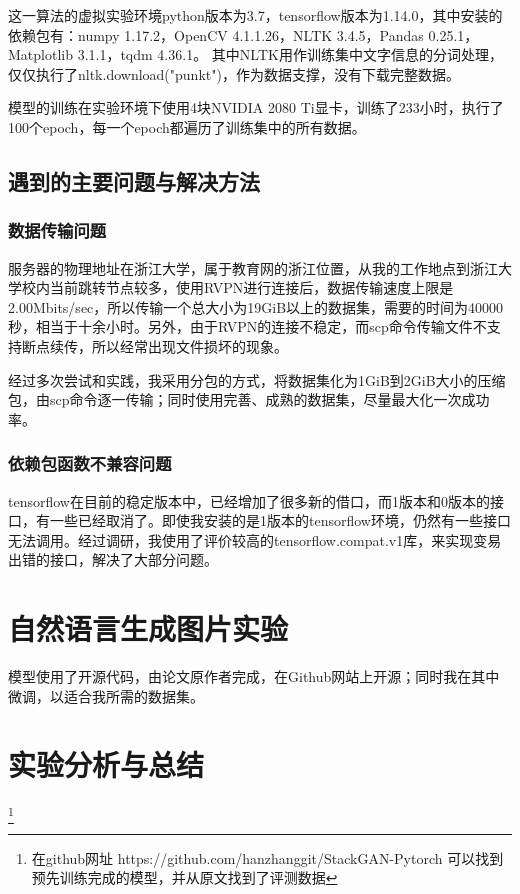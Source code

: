 这一算法的虚拟实验环境python版本为3.7，tensorflow版本为1.14.0，其中安装的依赖包有：numpy 1.17.2，OpenCV 4.1.1.26，NLTK 3.4.5，Pandas 0.25.1，Matplotlib 3.1.1，tqdm 4.36.1。
其中NLTK用作训练集中文字信息的分词处理，仅仅执行了nltk.download("punkt")，作为数据支撑，没有下载完整数据。

模型的训练在实验环境下使用4块NVIDIA 2080 Ti显卡，训练了233小时，执行了100个epoch，每一个epoch都遍历了训练集中的所有数据。


\subsection{遇到的主要问题与解决方法}
\subsubsection{数据传输问题}
服务器的物理地址在浙江大学，属于教育网的浙江位置，从我的工作地点到浙江大学校内当前跳转节点较多，使用RVPN进行连接后，数据传输速度上限是2.00Mbits/sec，所以传输一个总大小为19GiB以上的数据集，需要的时间为40000秒，相当于十余小时。另外，由于RVPN的连接不稳定，而scp命令传输文件不支持断点续传，所以经常出现文件损坏的现象。

经过多次尝试和实践，我采用分包的方式，将数据集化为1GiB到2GiB大小的压缩包，由scp命令逐一传输；同时使用完善、成熟的数据集，尽量最大化一次成功率。

\subsubsection{依赖包函数不兼容问题}
tensorflow在目前的稳定版本中，已经增加了很多新的借口，而1版本和0版本的接口，有一些已经取消了。即使我安装的是1版本的tensorflow环境，仍然有一些接口无法调用。经过调研，我使用了评价较高的tensorflow.compat.v1库，来实现变易出错的接口，解决了大部分问题。

\section{自然语言生成图片实验}
模型使用了开源代码，由论文原作者完成，在Github网站上开源；同时我在其中微调，以适合我所需的数据集。

\section{实验分析与总结}


\footnote{在github网址 https://github.com/hanzhanggit/StackGAN-Pytorch 可以找到预先训练完成的模型，并从原文找到了评测数据}

